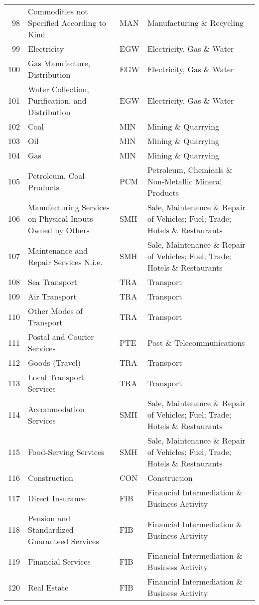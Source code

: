 \documentclass[a4paper]{article}
\begin{document}
\begin{table}[ht]
{\begin{tabular}{rlll}
  98 & Commodities not Specified According to Kind & MAN & Manufacturing \& Recycling \\ 
  99 & Electricity & EGW & Electricity, Gas \& Water \\ 
  100 & Gas Manufacture, Distribution & EGW & Electricity, Gas \& Water \\ 
  101 & Water Collection, Puriﬁcation, and Distribution & EGW & Electricity, Gas \& Water \\ 
  102 & Coal & MIN & Mining \& Quarrying \\ 
  103 & Oil & MIN & Mining \& Quarrying \\ 
  104 & Gas & MIN & Mining \& Quarrying \\ 
  105 & Petroleum, Coal Products & PCM & Petroleum, Chemicals \& Non-Metallic Mineral Products \\ 
  106 & Manufacturing Services on Physical Inputs Owned by Others & SMH & Sale, Maintenance \& Repair of Vehicles; Fuel; Trade; Hotels \& Restaurants \\ 
  107 & Maintenance and Repair Services N.i.e. & SMH & Sale, Maintenance \& Repair of Vehicles; Fuel; Trade; Hotels \& Restaurants \\ 
  108 & Sea Transport & TRA & Transport \\ 
  109 & Air Transport & TRA & Transport \\ 
  110 & Other Modes of Transport & TRA & Transport \\ 
  111 & Postal and Courier Services & PTE & Post \& Telecommunications \\ 
  112 & Goods (Travel) & TRA & Transport \\ 
  113 & Local Transport Services & TRA & Transport \\ 
  114 & Accommodation Services & SMH & Sale, Maintenance \& Repair of Vehicles; Fuel; Trade; Hotels \& Restaurants \\ 
  115 & Food-Serving Services & SMH & Sale, Maintenance \& Repair of Vehicles; Fuel; Trade; Hotels \& Restaurants \\ 
  116 & Construction & CON & Construction \\ 
  117 & Direct Insurance & FIB & Financial Intermediation \& Business Activity \\ 
  118 & Pension and Standardized Guaranteed Services & FIB & Financial Intermediation \& Business Activity \\ 
  119 & Financial Services & FIB & Financial Intermediation \& Business Activity \\ 
  120 & Real Estate & FIB & Financial Intermediation \& Business Activity \\ 

\end{tabular}}
\end{table}
\end{document}

